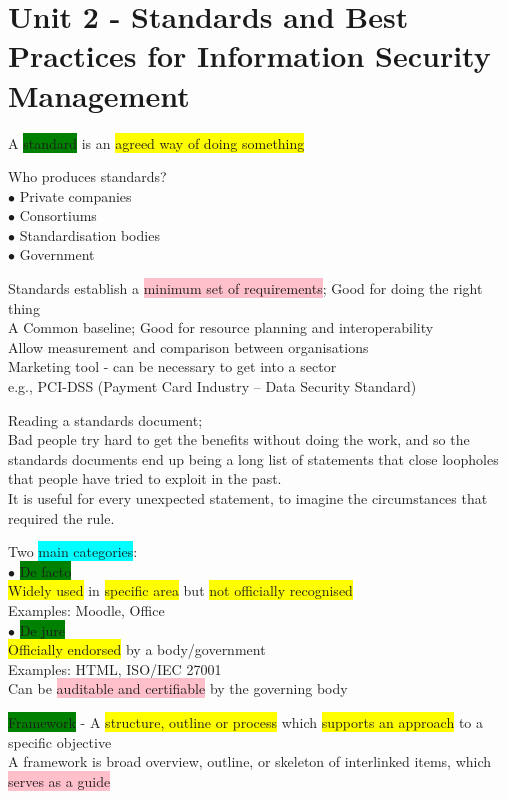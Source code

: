\documentclass[tikz,border=10pt]{project_plan}
\newcommand{\bulletPoint}{\hspace{-3.1pt}$\bullet$ \hspace{5pt}}
\begin{document}
\chapter{Unit 2 - Standards and Best Practices for Information Security Management}
A \colorbox{green}{standard} is an \colorbox{yellow}{agreed way of doing something}

Who produces standards?\\
\bulletPoint Private companies\\
\bulletPoint Consortiums\\
\bulletPoint Standardisation bodies\\
\bulletPoint Government

Standards establish a \colorbox{pink}{minimum set of requirements}; Good for doing the right thing\\
A Common baseline;  Good for resource planning and interoperability\\
Allow measurement and comparison between organisations\\
Marketing tool - can be necessary to get into a sector\\
e.g., PCI-DSS (Payment Card Industry – Data Security Standard)

Reading a standards document;\\
Bad people try hard to get the benefits without doing the work, and so the
standards documents end up being a long list of statements that close loopholes
that people have tried to exploit in the past.\\
It is useful for every unexpected statement, to imagine the circumstances
that required the rule.

Two \colorbox{cyan}{main categories}:\\
\bulletPoint \colorbox{green}{De facto}\\
\colorbox{yellow}{Widely used} in \colorbox{yellow}{specific area} but \colorbox{yellow}{not officially recognised}\\
Examples: Moodle, Office\\
\bulletPoint \colorbox{green}{De jure}\\
\colorbox{yellow}{Officially endorsed} by a body/government\\
Examples: HTML, ISO/IEC 27001\\
Can be \colorbox{pink}{auditable and certifiable} by the governing body

\colorbox{green}{Framework} -
A \colorbox{yellow}{structure, outline or process} which \colorbox{yellow}{supports an approach} to a specific objective\\
A framework is broad overview, outline, or skeleton of interlinked items, which \colorbox{pink}{serves as a guide}
\end{document}

